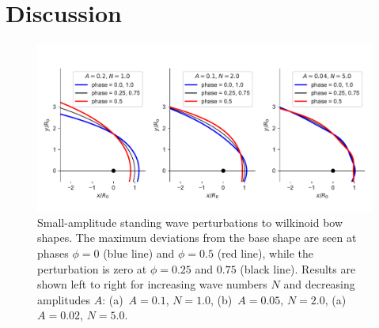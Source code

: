 
\section{Discussion}
\label{sec:discussion}




\begin{figure}[t!]
  \centering
  \includegraphics[width=\linewidth]{figs/compare_xyprime_wave-wilkinoid}
  \caption{Small-amplitude standing wave perturbations to wilkinoid
    bow shapes.  The maximum deviations from the base shape are seen
    at phases \(\phi = 0\) (blue line) and \(\phi = 0.5\) (red line), while
    the perturbation is zero at \(\phi = 0.25\) and \(0.75\) (black
    line).  Results are shown left to right for increasing wave
    numbers \(N\) and decreasing amplitudes \(A\): (a)~\(A = 0.1\),
    \(N = 1.0\), (b)~\(A = 0.05\), \(N = 2.0\), (a)~\(A = 0.02\),
    \(N = 5.0\).}
  \label{fig:perturb-shapes}
\end{figure}


